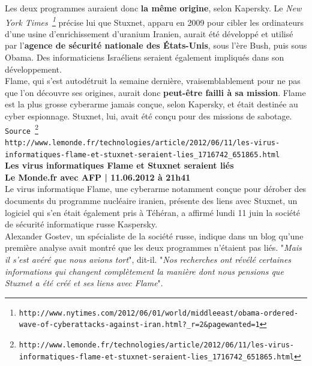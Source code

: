 \documentclass[11pt,twoside,a4paper]{article}
\begin{document}
Les deux programmes auraient donc \textbf{la m{\^e}me origine}, selon Kapersky. Le \emph{New York Times~\footnote{\texttt{http://www.nytimes.com/2012/06/01/world/middleeast/obama-ordered-wave-of-cyberattacks-against-iran.html?\_r=2\&pagewanted=1}}} pr{\'e}cise lui que Stuxnet, apparu en 2009 pour cibler les ordinateurs d'une usine d'enrichissement d'uranium Iranien, aurait {\'e}t{\'e} d{\'e}velopp{\'e} et utilis{\'e} par l'\textbf{agence de s{\'e}curit{\'e} nationale des {\'E}tats-Unis}, sous l'{\`e}re Bush, puis sous Obama. Des informaticiens Isra{\'e}liens seraient {\'e}galement impliqu{\'e}s dans son d{\'e}veloppement.~\\

Flame, qui s'est autod{\'e}truit la semaine derni{\`e}re, vraisemblablement pour ne pas que l'on d{\'e}couvre ses origines, aurait donc \textbf{peut-{\^e}tre failli {\`a} sa mission}. Flame est la plus grosse cyberarme jamais con\c{c}ue, selon Kapersky, et {\'e}tait destin{\'e}e au cyber espionnage. Stuxnet, lui, avait {\'e}t{\'e} con\c{c}u pour des missions de sabotage.~\\

\texttt{Source~\footnote{\texttt{http://www.lemonde.fr/technologies/article/2012/06/11/les-virus-informatiques-flame-et-stuxnet-seraient-lies\_1716742\_651865.html}}}~\\


\texttt{http://www.lemonde.fr/technologies/article/2012/06/11/les-virus-informatiques-flame-et-stuxnet-seraient-lies\_1716742\_651865.html}~\\

\textbf{\LARGE Les virus informatiques Flame et Stuxnet seraient li{\'e}s}~\\

\textbf{\small Le Monde.fr avec AFP | 11.06.2012 {\`a} 21h41}~\\

Le virus informatique Flame, une cyberarme notamment con\c{c}ue pour d{\'e}rober des documents du programme nucl{\'e}aire iranien, pr{\'e}sente des liens avec Stuxnet, un logiciel qui s'en {\'e}tait {\'e}galement pris {\`a} T{\'e}h{\'e}ran, a affirm{\'e} lundi 11 juin la soci{\'e}t{\'e} de s{\'e}curit{\'e} informatique russe Kaspersky.~\\

Alexander Gostev, un sp{\'e}cialiste de la soci{\'e}t{\'e} russe, indique dans un blog qu'une premi{\`e}re analyse avait montr{\'e} que les deux programmes n'{\'e}taient pas li{\'e}s. "\emph{Mais il s'est av{\'e}r{\'e} que nous avions tort}", dit-il. "\emph{Nos recherches ont r{\'e}v{\'e}l{\'e} certaines informations qui changent compl{\`e}tement la mani{\`e}re dont nous pensions que Stuxnet a {\'e}t{\'e} cr{\'e}{\'e} et ses liens avec Flame}".~\\
\end{document}
